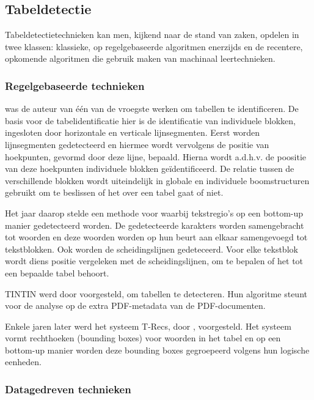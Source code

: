 \subsection{Tabeldetectie}
\label{subsec:tabel-detectie}

Tabeldetectietechnieken kan men, kijkend naar de stand van zaken, opdelen in twee klassen: klassieke, op regelgebaseerde algoritmen enerzijds en de recentere, opkomende algoritmen die gebruik maken van machinaal leertechnieken.

\subsubsection{Regelgebaseerde technieken}

\textcite{Watanabe1991} was de auteur van één van de vroegste werken om tabellen te identificeren. De basis voor de tabelidentificatie hier is de identificatie van individuele blokken, ingesloten door horizontale en verticale lijnsegmenten. Eerst worden lijnsegmenten gedetecteerd en hiermee wordt vervolgens de positie van hoekpunten, gevormd door deze lijne, bepaald. Hierna wordt a.d.h.v. de poositie van deze hoekpunten individuele blokken geïdentificeerd. De relatie tussen de verschillende blokken wordt uiteindelijk in globale en individuele boomstructuren gebruikt om te beslissen of het over een tabel gaat of niet.

Het jaar daarop stelde \textcite{Laurentini1992} een methode voor waarbij tekstregio's op een bottom-up manier gedetecteerd worden. De gedetecteerde karakters worden samengebracht tot woorden en deze woorden worden op hun beurt aan elkaar samengevoegd tot tekstblokken. Ook worden de scheidingslijnen gedeteceerd. Voor elke tekstblok wordt diens positie vergeleken met de scheidingslijnen, om te bepalen of het tot een bepaalde tabel behoort.

TINTIN werd door \textcite{Pyreddy1997} voorgesteld, om tabellen te detecteren. Hun algoritme steunt voor de analyse op de extra PDF-metadata van de PDF-documenten.

Enkele jaren later werd het systeem T-Recs, door \textcite{Kieninger2001}, voorgesteld. Het systeem vormt rechthoeken (bounding boxes) voor woorden in het tabel en op een bottom-up manier worden deze bounding boxes gegroepeerd volgens hun logische eenheden. 

\subsubsection{Datagedreven technieken}

